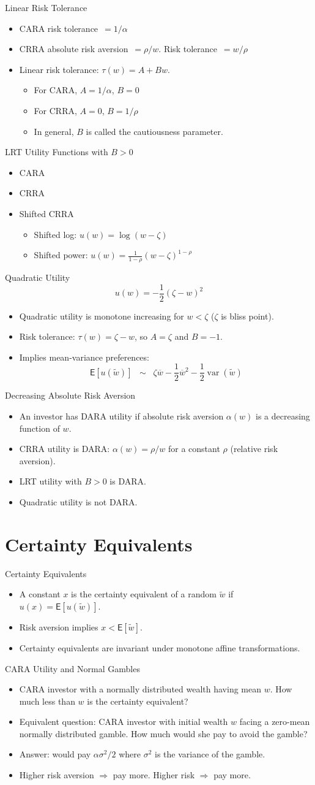 \documentclass[10pt]{beamer}
\DeclareMathOperator{\var}{var}
\newcommand{\bi}{\begin{itemize}}
\newcommand{\ei}{\end{itemize}}
\newcommand{\im}{\item}
\newcommand{\mye}{\ensuremath{\mathsf{E}}}
\begin{document}
\begin{frame}{Linear Risk Tolerance}
  \bi
  \im CARA risk tolerance $\,= 1/\alpha$
  \im CRRA absolute risk aversion $\,= \rho/w$.  Risk tolerance $\,= w/\rho$
  \im Linear risk tolerance: $\tau(w) = A + B w$.
  \bi
  \im For CARA, $A=1/\alpha$, $B=0$
  \im For CRRA, $A=0$, $B = 1/\rho$
  \im In general, $B$ is called the cautiousness parameter.
  \ei
  \ei
  \end{frame}
  
  \begin{frame}{LRT Utility Functions with $B>0$}
  \bi
  \im CARA
  \im CRRA
  \im Shifted CRRA
  \bi
  \im Shifted log: $u(w) = \log (w-\zeta)$
  \im Shifted power: $u(w) = \frac{1}{1-\rho}(w-\zeta)^{1-\rho}$
  \ei
  \ei
  \end{frame}

  \begin{frame}{Quadratic Utility}
   $$u(w) = -\frac{1 }{2}\left(\zeta-w\right)^2$$ 
  \bi
  \im Quadratic utility is monotone increasing for $w<\zeta$ ($\zeta$ is bliss point).
  \im Risk tolerance: $\tau(w) = \zeta-w$, so $A=\zeta$ and $B=-1$.   
  \im Implies mean-variance preferences:
  $$\mye[u(\tilde{w})] \;\;\sim  \;\;\zeta \overline{w} - \frac{1}{2}\overline{w}^2 - \frac{1}{2}\var(\widetilde{w})$$
  \ei
  \end{frame}

  \begin{frame}{Decreasing Absolute Risk Aversion}
    \bi
    \im An investor has DARA utility if absolute risk aversion $\alpha(w)$ is a decreasing function of $w$.
    \im CRRA utility is DARA: $\alpha(w) = \rho/w$ for a constant $\rho$ (relative risk aversion).
    \im LRT utility with $B>0$ is DARA.
    \im Quadratic utility is not DARA.
    \ei
  \end{frame}


\section{Certainty Equivalents}

\begin{frame}{Certainty Equivalents}
  \bi
  \im A constant $x$ is the certainty equivalent of a random $\tilde{w}$ if $u(x) = \mye[u(\tilde{w})]$.  
\im Risk aversion implies $x<\mye[\tilde{w}]$.
\im Certainty equivalents are invariant under monotone affine transformations.
\ei
\end{frame}

\begin{frame}{CARA Utility and Normal Gambles}
  \bi
  \im CARA investor with a normally distributed wealth having mean $w$. How much less than $w$ is the certainty equivalent?
  \im Equivalent question: CARA investor with initial wealth $w$ facing a \alert{zero-mean} normally distributed gamble.  How much would she pay to avoid the gamble?
  \im Answer: would pay $\alpha \sigma^2/2$ where $\sigma^2$ is the variance of the gamble.
  \im Higher risk aversion $\Rightarrow$ pay more.  Higher risk $\Rightarrow$ pay more.
  \ei
\end{frame}
\end{document}
